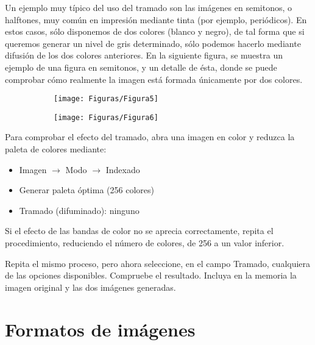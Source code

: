 \documentclass[es,practica]{uah}
\begin{document}
Un ejemplo muy típico del uso del tramado son las imágenes en semitonos, o halftones, muy común en impresión mediante tinta (por ejemplo, periódicos). En estos casos, sólo disponemos de dos colores (blanco y negro), de tal forma que si queremos generar un nivel de gris determinado, sólo podemos hacerlo mediante difusión de los dos colores anteriores. En la siguiente figura, se muestra un ejemplo de una figura en semitonos, y un detalle de ésta, donde se puede comprobar cómo realmente la imagen está formada únicamente por dos colores.

\begin{figure}[h!]
	\centering
\begin{subfigure}
  \centering
  \texttt{[image: Figuras/Figura5]}
\end{subfigure}
\begin{subfigure}
  \centering
  \texttt{[image: Figuras/Figura6]}
\end{subfigure}
\end{figure}


Para comprobar el efecto del tramado, abra una imagen en color y reduzca la paleta de colores mediante:
\begin{itemize}
	\item Imagen $\rightarrow$ Modo $\rightarrow$ Indexado
	\item Generar paleta óptima (256 colores)
	\item Tramado (difuminado): ninguno
\end{itemize}

Si el efecto de las bandas de color no se aprecia correctamente, repita el procedimiento, reduciendo el número de colores, de 256 a un valor inferior.

Repita el mismo proceso, pero ahora seleccione, en el campo Tramado, cualquiera de las opciones disponibles. Compruebe el resultado. Incluya en la memoria la imagen original y las dos imágenes generadas.


\section{Formatos de imágenes}
\end{document}
